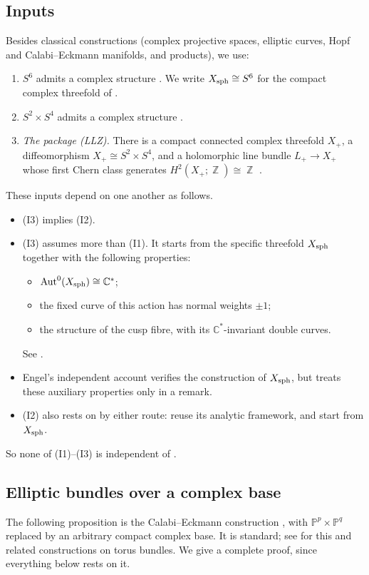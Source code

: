 \documentclass{article}
\DeclareMathOperator{\Z}{\mathbb{Z}}
\theoremstyle{definition}
\theoremstyle{plain}
\newcommand{\C}{\mathbb{C}}
\newcommand{\PP}{\mathbb{P}}
\begin{document}
\subsection{Inputs}\label{sec:inputs}
Besides classical constructions (complex projective spaces, elliptic curves, Hopf and
Calabi--Eckmann manifolds, and products), we use:
\begin{enumerate}
\item[(I1)] $S^6$ admits a complex structure \cite{AC26,Engel26}. We write
  $X_{\rm sph}\cong S^6$ for the compact complex threefold of \cite{AC26}.
\item[(I2)] $S^2\times S^4$ admits a complex structure \cite{GFL26,LLZ26}.
\item[(I3)] \emph{The package (LLZ).} There is a compact connected complex threefold
  $X_+$, a diffeomorphism $X_+\cong S^2\times S^4$, and a holomorphic line bundle
  $L_+\to X_+$ whose first Chern class generates $H^2(X_+;\Z)\cong\Z$ \cite{LLZ26}.
\end{enumerate}
These inputs depend on one another as follows.
\begin{itemize}
\item (I3) implies (I2).
\item (I3) assumes more than (I1). It starts from the specific threefold $X_{\rm sph}$
  together with the following properties:
  \begin{itemize}
  \item $\mathrm{Aut}^0(X_{\rm sph})\cong\C^*$;
  \item the fixed curve of this action has normal weights $\pm1$;
  \item the structure of the cusp fibre, with its $\C^*$-invariant double curves.
  \end{itemize}
  See \cite[Thm.~4.5, Prop.~4.6, Props.~9.23--9.24, Rem.~9.25]{AC26}.
\item Engel's independent account \cite{Engel26} verifies the construction of
  $X_{\rm sph}$, but treats these auxiliary properties only in a remark.
\item (I2) also rests on \cite{AC26} by either route: \cite{GFL26} reuse its analytic
  framework, and \cite{LLZ26} start from $X_{\rm sph}$.
\end{itemize}
So none of (I1)--(I3) is independent of \cite{AC26}.

\subsection{Elliptic bundles over a complex base}\label{sec:CE}
The following proposition is the Calabi--Eckmann construction \cite{CalabiEckmann53},
with $\PP^p\times\PP^q$ replaced by an arbitrary compact complex base. It is standard;
see \cite{Morimoto63,Hofer93,GoldsteinProkushkin04,GGP08} for this and related
constructions on torus bundles. We give a complete proof, since everything below rests
on it.
\end{document}
